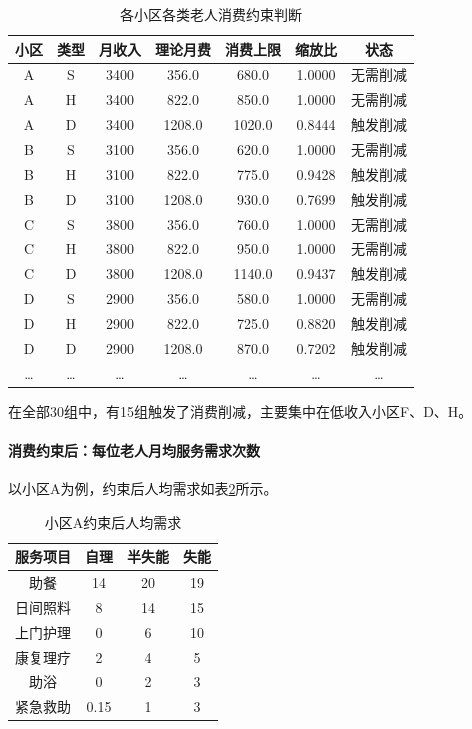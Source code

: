 \documentclass[UTF8]{ctexart}
\begin{document}
\begin{longtable}{|c|c|c|c|c|c|c|}
\caption{各小区各类老人消费约束判断}
\label{tab:constraint_judge}\\
\hline
\textbf{小区} & \textbf{类型} & \textbf{月收入} & \textbf{理论月费} & \textbf{消费上限} & \textbf{缩放比} & \textbf{状态} \\
\hline
\endfirsthead
\hline
\endhead
A & S & 3400 & 356.0 & 680.0 & 1.0000 & 无需削减 \\
A & H & 3400 & 822.0 & 850.0 & 1.0000 & 无需削减 \\
A & D & 3400 & 1208.0 & 1020.0 & 0.8444 & 触发削减 \\
B & S & 3100 & 356.0 & 620.0 & 1.0000 & 无需削减 \\
B & H & 3100 & 822.0 & 775.0 & 0.9428 & 触发削减 \\
B & D & 3100 & 1208.0 & 930.0 & 0.7699 & 触发削减 \\
C & S & 3800 & 356.0 & 760.0 & 1.0000 & 无需削减 \\
C & H & 3800 & 822.0 & 950.0 & 1.0000 & 无需削减 \\
C & D & 3800 & 1208.0 & 1140.0 & 0.9437 & 触发削减 \\
D & S & 2900 & 356.0 & 580.0 & 1.0000 & 无需削减 \\
D & H & 2900 & 822.0 & 725.0 & 0.8820 & 触发削减 \\
D & D & 2900 & 1208.0 & 870.0 & 0.7202 & 触发削减 \\
\ldots & \ldots & \ldots & \ldots & \ldots & \ldots & \ldots \\
\hline
\end{longtable}

在全部30组中，有15组触发了消费削减，主要集中在低收入小区F、D、H。

\paragraph{消费约束后：每位老人月均服务需求次数}
以小区A为例，约束后人均需求如表\ref{tab:constraint_A}所示。

\begin{table}[H]
\centering
\caption{小区A约束后人均需求}
\label{tab:constraint_A}
\renewcommand{\arraystretch}{1.3}
\begin{tabular}{|c|c|c|c|}
\hline
\textbf{服务项目} & \textbf{自理} & \textbf{半失能} & \textbf{失能} \\
\hline
助餐 & 14 & 20 & 19 \\
\hline
日间照料 & 8 & 14 & 15 \\
\hline
上门护理 & 0 & 6 & 10 \\
\hline
康复理疗 & 2 & 4 & 5 \\
\hline
助浴 & 0 & 2 & 3 \\
\hline
紧急救助 & 0.15 & 1 & 3 \\
\hline
\end{tabular}
\end{table}
\end{document}
